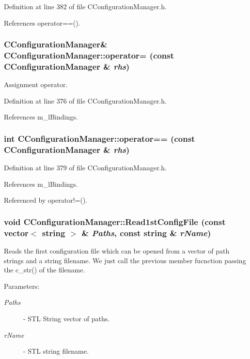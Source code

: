 Definition at line 382 of file CConfiguration\-Manager.h.

References operator==().
\subsubsection{\setlength{\rightskip}{0pt plus 5cm}CConfiguration\-Manager\& CConfiguration\-Manager::operator= (const CConfiguration\-Manager \& {\em rhs})\hspace{0.3cm}{\tt  [inline]}}\label{classCConfigurationManager_a4}


Assignment operator.



Definition at line 376 of file CConfiguration\-Manager.h.

References m\_\-l\-Bindings.
\subsubsection{\setlength{\rightskip}{0pt plus 5cm}int CConfiguration\-Manager::operator== (const CConfiguration\-Manager \& {\em rhs})\hspace{0.3cm}{\tt  [inline]}}\label{classCConfigurationManager_a5}




Definition at line 379 of file CConfiguration\-Manager.h.

References m\_\-l\-Bindings.

Referenced by operator!=().
\subsubsection{\setlength{\rightskip}{0pt plus 5cm}void CConfiguration\-Manager::Read1st\-Config\-File (const vector$<$ string $>$ \& {\em Paths}, const string \& {\em r\-Name})}\label{classCConfigurationManager_a16}


Reads the first configuration file which can be opened from a vector of path strings and a string filename. We just call the previous member fucnction passing the c\_\-str() of the filename. \begin{Desc}
\item[Parameters: ]\par
\begin{description}
\item[{\em 
Paths}]- STL String vector of paths. \item[{\em 
r\-Name}]- STL string filename. \end{description}
\end{Desc}



